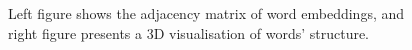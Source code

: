\documentclass{article} %
\newcommand{\eqnref}[1]{(\ref{eqn:#1})}
\begin{document}



\begin{figure}[h!]
	\centering
	\hspace{0.5cm}
	\caption{Left figure shows the adjacency matrix of word embeddings, and right figure presents a 3D visualisation of words' structure.}
	\label{fig2}
\end{figure}
\end{document}
